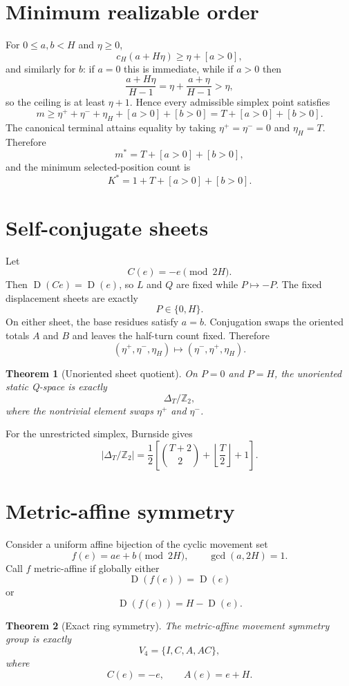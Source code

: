 \documentclass[11pt]{article}
\newtheorem{theorem}{Theorem}
\theoremstyle{definition}
\newcommand{\Z}{\mathbb{Z}}
\newcommand{\D}{\operatorname{D}}
\newcommand{\1}{\mathbf{1}}
\begin{document}
\section{Minimum realizable order}
For $0\le a,b<H$ and $\eta\ge0$,
\[
c_H(a+H\eta)\ge \eta+[a>0],
\]
and similarly for $b$: if $a=0$ this is immediate, while if $a>0$ then
\[
\frac{a+H\eta}{H-1}=\eta+\frac{a+\eta}{H-1}>\eta,
\]
so the ceiling is at least $\eta+1$. Hence every admissible simplex point satisfies
\[
m\ge \eta^++\eta^-+\eta_H+[a>0]+[b>0]
=T+[a>0]+[b>0].
\]
The canonical terminal attains equality by taking $\eta^+=\eta^-=0$ and $\eta_H=T$. Therefore
\[
m^\ast=T+[a>0]+[b>0],
\]
and the minimum selected-position count is
\[
\boxed{
K^\ast=1+T+[a>0]+[b>0].
}
\]

\section{Self-conjugate sheets}
Let
\[
C(e)=-e\pmod{2H}.
\]
Then $\D(Ce)=\D(e)$, so $L$ and $Q$ are fixed while $P\mapsto-P$. The fixed displacement sheets are exactly
\[
P\in\{0,H\}.
\]
On either sheet, the base residues satisfy $a=b$. Conjugation swaps the oriented totals $A$ and $B$ and leaves the half-turn count fixed. Therefore
\[
(\eta^+,\eta^-,\eta_H)\mapsto(\eta^-,\eta^+,\eta_H).
\]

\begin{theorem}[Unoriented sheet quotient]
On $P=0$ and $P=H$, the unoriented static Q-space is exactly
\[
\boxed{\Delta_T/\Z_2},
\]
where the nontrivial element swaps $\eta^+$ and $\eta^-$.
\end{theorem}

For the unrestricted simplex, Burnside gives
\[
\left|\Delta_T/\Z_2\right|
=
\frac12\left[
\binom{T+2}{2}
+\left\lfloor\frac T2\right\rfloor+1
\right].
\]

\section{Metric-affine symmetry}
Consider a uniform affine bijection of the cyclic movement set
\[
f(e)=ae+b\pmod{2H},\qquad \gcd(a,2H)=1.
\]
Call $f$ metric-affine if globally either
\[
\D(f(e))=\D(e)
\]
or
\[
\D(f(e))=H-\D(e).
\]

\begin{theorem}[Exact ring symmetry]
The metric-affine movement symmetry group is exactly
\[
\boxed{
V_4=\{I,C,A,AC\},
}
\]
where
\[
C(e)=-e,\qquad A(e)=e+H.
\]
\end{theorem}
\end{document}

